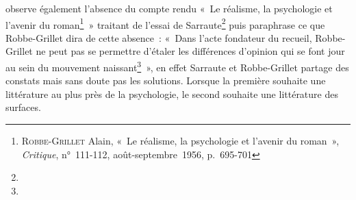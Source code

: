 \documentclass[12pt, a4paper]{article}
\begin{document}
\galia{} observe également l'absence du compte rendu «~Le réalisme, la psychologie et l’avenir du roman\footnote{\textsc{Robbe-Grillet} Alain, «~Le réalisme, la psychologie et l’avenir du roman~», \textit{Critique}, n°~111-112, août-septembre~1956, p.~695-701}~» traitant de l'essai de Sarraute\footnote{} puis paraphrase ce que Robbe-Grillet dira de cette absence~: «~Dans l’acte fondateur du recueil, Robbe-Grillet ne peut pas se permettre d’étaler les différences d’opinion qui se font jour au sein du mouvement naissant\footnote{}~», en effet Sarraute et Robbe-Grillet partage des constats mais sans doute pas les solutions. Lorsque la première souhaite une littérature au plus près de la psychologie, le second souhaite une littérature des surfaces. 
    
\end{document}
